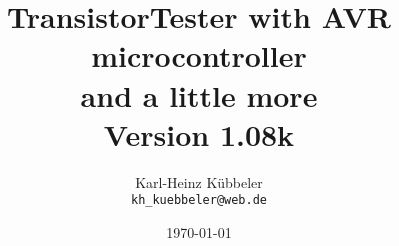 \documentclass[12pt,a4paper,oneside,english]{report}
\begin{document}
\title{TransistorTester with AVR microcontroller \\
and a little more\\
Version 1.08k \\
}
\author{Karl-Heinz K\"ubbeler\\
\texttt{kh\_kuebbeler@web.de}}
\date{\today}
\maketitle
\tableofcontents













 
 
 
 
 




\end{document}
